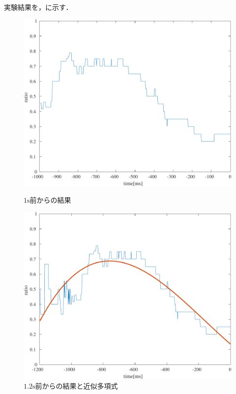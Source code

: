 \section{\result}
実験結果を，に示す．
\begin{figure}[H]
    \centering
    \begin{minipage}{.48\textwidth}
        \centering
        \includegraphics[keepaspectratio,width=.8\textwidth]{../../Figures/12_01_graph.pdf}
        \caption{\(1\textrm{s}\)前からの結果}
        \label{fig:\kadaia 実験結果}
    \end{minipage}
    \begin{minipage}{.48\textwidth}
        \centering
        \includegraphics[keepaspectratio,width=.8\textwidth]{../../Figures/12_02_graph.pdf}
        \caption{\(1.2\textrm{s}\)前からの結果と近似多項式}
        \label{fig:\kadaia 実験結果2}
    \end{minipage}
\end{figure}
